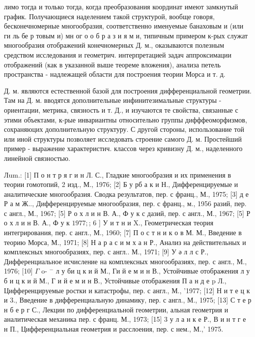 \documentclass[10pt]{article}
\begin{document}
лимо тогда и только тогда, когда преобразования координат имеют замкнутый график. Получающиеся наделением такой структурой, вообще говоря, бесконечномерные многообразия, соответственно именуемые банаховым и (или ги ль бе р товым и) мн ог о о б р а з и я м и, типичным примером к-рых служат многообразия отображений конечномерных Д. м., оказываются полезным средством исследования и геометрич. интерпретацией задач аппроксимации отображений (как в указанной выше теореме вложения), анализа петель пространства - надлежащей области для построения теории Морса и т. д.



Д. м. являются естественной базой для построения дифференциальной геометрии. Там на Д. м. вводятся дополнительные инфинитезимальные структуры - ориентации, метрика, связность и т. Д., и изучаются те свойства, связанные с этими объектами, к-рые инвариантны относительно группы дифффеоморфизмов, сохраняюцих дополнительную структуру. С другой стороны, использование той или иной структуры позволяет исследовать строение самого Д. м. Простейший пример - выражение характеристич. классов через кривизну Д. м., наделенного линейной связностью.



Лum.: [1] П о н т р я г и н Л. С., Гладкие многообразия и их применения в теории гомотопий, 2 изд., М., 1976; [2] Б у рб а к и Н., Дифференцируемые и аналитические многообразия. Сводка результатов, пер. с франц., М., 1975; [3] д е Р а м Ж.., Дифференцируемые многообразия, пер. с франц., м., 1956 разий, пер. с англ., М., 1967; [5] Р о х л и н В. А., Ф у к с дазий, пер. с англ., М., 1967; [5] Р о х л и н В. А., Ф у к $1977 ;$; 6 ] У и т н и X., Геометрическая теория интегрирования, пер. с англ., М., 1960; [7] П о с т н и к о в М. М., Введение в теорию Морса, М., 1971; [8] Н а р а с и м х а н Р., Анализ на действительных и комплексных многообразиях, пер. с англ.. М., 1971; [9] У ә л л с Р., Дифференциальное исчисление на комплексных многообразиях, пер. с англ., М., 1976; [10] $\Gamma$ o- $^{-}$ л у би ц к и й М., Ги й е м и н В., Устойчивые отображения л у б и ц к и й М., Г и й е м и н В., Устойчивые отображения П а н д е $\mathrm{p}$ Л., Цифференцируемые ростки и катастрофы, пер. с англ., М., '1977; [12] Н и т е ц к и 3., Введение в дифференциальную динамику, пер. с англ., М., 1975; [13] С т е р н б е р г С., Лекции по дифференциальной геометрии, альная геометрия и аналитическая механика пер. с франц. М., 1973; [15] 3 у л а н к е Р., В и н т г е н П., Цифференциальная геометрия и расслоения, пер. с нем., М.,' 1975.
\end{document}

